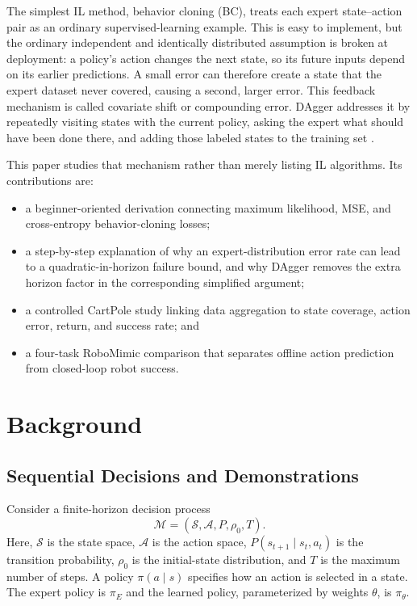 \documentclass[10pt]{article}
\begin{document}
The simplest IL method, behavior cloning (BC), treats each expert state--action
pair as an ordinary supervised-learning example. This is easy to implement, but
the ordinary independent and identically distributed assumption is broken at
deployment: a policy's action changes the next state, so its future inputs
depend on its earlier predictions. A small error can therefore create a state
that the expert dataset never covered, causing a second, larger error. This
feedback mechanism is called covariate shift or compounding error. DAgger
addresses it by repeatedly visiting states with the current policy, asking the
expert what should have been done there, and adding those labeled states to the
training set \citep{ross2011dagger}.

This paper studies that mechanism rather than merely listing IL algorithms. Its
contributions are:
\begin{itemize}
  \item a beginner-oriented derivation connecting maximum likelihood, MSE, and
  cross-entropy behavior-cloning losses;
  \item a step-by-step explanation of why an expert-distribution error rate can
  lead to a quadratic-in-horizon failure bound, and why DAgger removes the extra
  horizon factor in the corresponding simplified argument;
  \item a controlled CartPole study linking data aggregation to state coverage,
  action error, return, and success rate; and
  \item a four-task RoboMimic comparison that separates offline action
  prediction from closed-loop robot success.
\end{itemize}

\section{Background}

\subsection{Sequential Decisions and Demonstrations}

Consider a finite-horizon decision process
\[
  \mathcal{M}=(\mathcal{S},\mathcal{A},P,\rho_0,T).
\]
Here, $\mathcal{S}$ is the state space, $\mathcal{A}$ is the action space,
$P(s_{t+1}\mid s_t,a_t)$ is the transition probability, $\rho_0$ is the
initial-state distribution, and $T$ is the maximum number of steps. A policy
$\pi(a\mid s)$ specifies how an action is selected in a state. The expert policy
is $\pi_E$ and the learned policy, parameterized by weights $\theta$, is
$\pi_\theta$.
\end{document}
